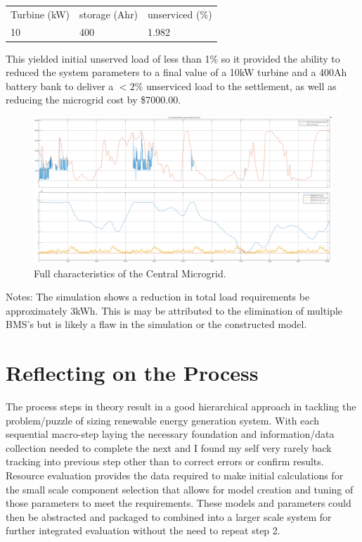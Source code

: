 \documentclass[journal]{IEEEtran}
\begin{document}
        \begin{table}[h!]
                \begin{tabular}{lll}
                Turbine (kW) & storage (Ahr) & unserviced (\%) \\
                10           & 400           & 1.982          
                \end{tabular}
                \end{table}

        This yielded initial unserved load of less than 1\% so it provided the ability to reduced the system parameters to a final value of a 10kW turbine and a 400Ah battery bank to deliver a $<2\%$ unserviced load to the settlement, as well as reducing the microgrid cost by \$7000.00.

        \begin{figure}[h!]
                \centering
                \includegraphics[width=0.7\linewidth]{fig/central_results.png}
                \caption{Full characteristics of the Central Microgrid.}
                \label{fig:central_micro}
        \end{figure} 

        Notes: The simulation shows a reduction in total load requirements be approximately 3kWh. This is may be attributed to the elimination of multiple BMS's but is likely a flaw in the simulation or the constructed model.

\section{Reflecting on the Process}
The process steps in theory result in a good hierarchical approach in tackling the problem/puzzle of sizing  renewable energy generation system. With each sequential macro-step laying the necessary foundation and information/data collection needed to complete the next and I found my self very rarely back tracking into previous step other than to correct errors or confirm results.
Resource evaluation provides the data required to make initial calculations for the small scale component selection that allows for model creation and tuning of those parameters to meet the requirements. These models and parameters could then be abstracted and packaged to combined into a larger scale system for further integrated evaluation without the need to repeat step 2.
\end{document}

